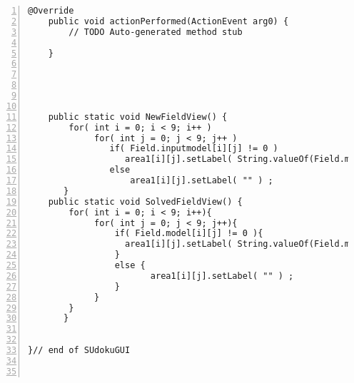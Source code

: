 \documentclass{article}
\begin{document}
\begin{lstlisting}[language=Tex,
basicstyle=\footnotesize\ttfamily,
numbers=left,stepnumber=1, 
morekeywords={assert},
tabsize=4,
breaklines=true]
	@Override
	public void actionPerformed(ActionEvent arg0) {
		// TODO Auto-generated method stub
		
	}
    
    



	public static void NewFieldView() {
		for( int i = 0; i < 9; i++ )
	         for( int j = 0; j < 9; j++ )
	            if( Field.inputmodel[i][j] != 0 )
	               area1[i][j].setLabel( String.valueOf(Field.model[i][j]) ) ;
	            else
	            	area1[i][j].setLabel( "" ) ;
	   }
	public static void SolvedFieldView() {
		for( int i = 0; i < 9; i++){
	         for( int j = 0; j < 9; j++){
	        	 if( Field.model[i][j] != 0 ){
	               area1[i][j].setLabel( String.valueOf(Field.model[i][j]) ) ;
	        	 }
	        	 else {
		            	area1[i][j].setLabel( "" ) ;
	        	 }
	         }
		}
	   }
	
	
}// end of SUdokuGUI
   


\end{lstlisting}

\newpage
\end{document}
